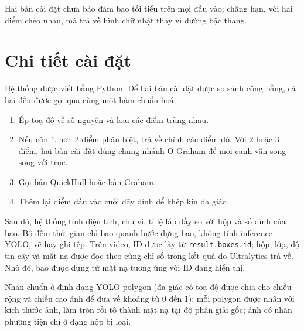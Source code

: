 Hai bản cài đặt chưa bảo đảm bao tối tiểu trên mọi đầu vào; chẳng hạn, với hai điểm chéo nhau, mã trả về hình chữ nhật thay vì đường bậc thang.

\section{Chi tiết cài đặt}

Hệ thống được viết bằng Python. Để hai bản cài đặt được so sánh công bằng, cả hai đều được gọi qua cùng một hàm chuẩn hoá:
\begin{enumerate}
  \item Ép toạ độ về số nguyên và loại các điểm trùng nhau.
  \item Nếu còn ít hơn 2 điểm phân biệt, trả về chính các điểm đó. Với 2 hoặc 3 điểm, hai bản cài đặt dùng chung nhánh O-Graham để mọi cạnh vẫn song song với trục.
  \item Gọi bản QuickHull hoặc bản Graham.
  \item Thêm lại điểm đầu vào cuối dãy đỉnh để khép kín đa giác.
\end{enumerate}
Sau đó, hệ thống tính diện tích, chu vi, tỉ lệ lấp đầy so với hộp và số đỉnh của bao.
Bộ đếm thời gian chỉ bao quanh bước dựng bao, không tính inference YOLO, vẽ hay ghi tệp.
Trên video, ID được lấy từ \texttt{result.boxes.id}; hộp, lớp, độ tin cậy và mặt nạ được đọc theo cùng chỉ số trong kết quả do Ultralytics trả về. Nhờ đó, bao được dựng từ mặt nạ tương ứng với ID đang hiển thị.

Nhãn chuẩn ở định dạng YOLO polygon (đa giác có toạ độ được chia cho chiều rộng và chiều cao ảnh để đưa về khoảng từ 0 đến 1): mỗi polygon được nhân với kích thước ảnh, làm tròn rồi tô thành mặt nạ tại độ phân giải gốc; ảnh có nhãn phương tiện chỉ ở dạng hộp bị loại.
